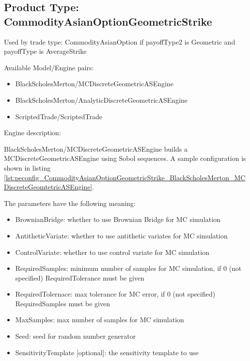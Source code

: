 \subsection{Product Type: CommodityAsianOptionGeometricStrike}

Used by trade type: CommodityAsianOption if payoffType2 is Geometric and payoffType is AverageStrike

Available Model/Engine pairs:

\begin{itemize}
  \item BlackScholesMerton/MCDiscreteGeometricASEngine
  \item BlackScholesMerton/AnalyticDiscreteGeometricASEngine
  \item ScriptedTrade/ScriptedTrade
\end{itemize}

Engine description:

BlackScholesMerton/MCDiscreteGeometricASEngine builds a MCDiscreteGeometricASEngine using Sobol sequences. A sample
configuration is shown in listing
\ref{lst:peconfig_CommodityAsianOptionGeometricStrike_BlackScholesMerton_MCDiscreteGeomtetricASEngine}.

The parameters have the following meaning:

\begin{itemize}
\item BrownianBridge: whether to use Brownian Bridge for MC simulation
\item AntitheticVariate: whether to use antithetic variates for MC simulation
\item ControlVariate: whether to use control variate for MC simulation
\item RequiredSamples: minimum number of samples for MC simulation, if 0 (not specified) RequiredTolerance must be given
\item RequiredTolernace: max tolerance for MC error, if 0 (not specified) RequiredSamples must be given
\item MaxSamples: max number of samples for MC simulation
\item Seed: seed for random number generator
\item SensitivityTemplate [optional]: the sensitivity template to use 
\end{itemize}

